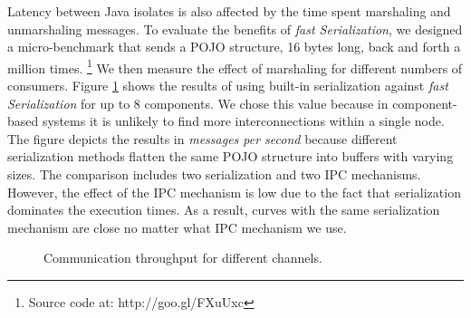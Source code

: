 Latency between Java isolates is also affected by the time spent marshaling and unmarshaling messages.
To evaluate the benefits of \textit{fast Serialization}, we designed a micro-benchmark that sends a POJO structure, 16 bytes long, back and forth a million times. \footnote{Source code at: http://goo.gl/FXuUxc}
We then measure the effect of marshaling for different numbers of consumers.
Figure \ref{fig:multicast-communication} shows the results of using built-in serialization against \textit{fast Serialization} for up to 8 components.
We chose this value because in component-based systems it is unlikely to find more interconnections within a single node.
The figure depicts the results in \textit{messages per second} because different serialization methods flatten the same POJO structure into buffers with varying sizes.
The comparison includes two serialization and two IPC mechanisms.
However, the effect of the IPC mechanism is low due to the fact that serialization dominates the execution times.
As a result, curves with the same serialization mechanism are close no matter what IPC mechanism we use.

\begin{figure}
\centering

\caption{Communication throughput for different channels.}
\label{fig:multicast-communication}
\vspace{-0.5cm}
\end{figure}


